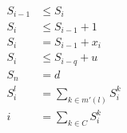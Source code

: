 \documentclass[]{llncs}
\newcommand{\TODO}[1]{ {\color{red}{#1} }}
\begin{document}
\begin{align}
    S_{i-1} & \leq S_i \\
    S_i & \leq S_{i-1} + 1 \\
    S_i & = S_{i-1} + x_i \\
    S_i & \leq S_{i-q} + u  \\
    S_n & = d \\
    S^l_i & = \sum_{k \in m'(l)} S^k_i \\
    i & = \sum_{k \in C} S^k_i
\end{align}


%
%
%
%
%
%
%
\end{document}
